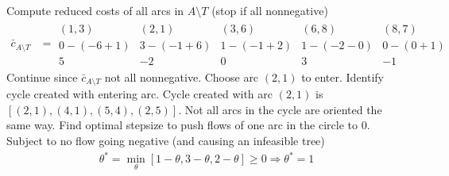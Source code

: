 \documentclass[11pt]{exam}
\begin{document}
\begin{questions}
\begin{parts}
\begin{subparts}
            \subpart Compute reduced costs of all arcs in $A\setminus T$ (stop if all nonnegative)
            \begin{align*}
                \bar c_{A\setminus T} &= \begin{array}{|ccccc|}
                    (1,3) & (2,1) & (3,6) & (6,8) & (8,7)\\\hline
                    0 - (-6 + 1) & 3 - (-1+6) & 1 - (-1+2) & 1 - (-2-0) & 0 - (0+1)\\
                    5 & -2& 0& 3& -1
                \end{array}
            \end{align*}
            Continue since $\bar c_{A\setminus T}$ not all nonnegative. Choose arc $(2,1)$ to enter. 
            \subpart Identify cycle created with entering arc. 
            \newline Cycle created with arc $(2,1)$ is $[(2,1), (4,1), (5,4), (2,5)]$. Not all arcs in the cycle are oriented the same way. 
            \subpart Find optimal stepsize to push flows of one arc in the circle to 0. Subject to no flow going negative (and causing an infeasible tree)
            \begin{align*}
                \theta^* = \min_\theta [1 - \theta, 3 - \theta, 2 - \theta] \geq 0 \Longrightarrow \theta^* = 1
            \end{align*}
        \end{subparts}
        
        

\end{parts}
\end{questions}
\end{document}
